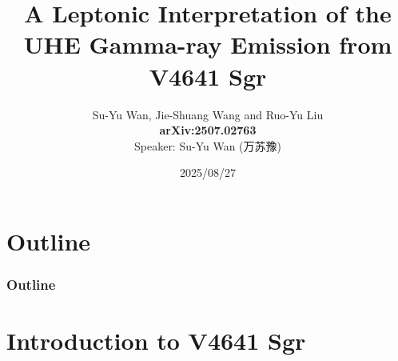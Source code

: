 \documentclass[10pt,aspectratio=169,mathserif]{beamer}
\title{A Leptonic Interpretation of the UHE Gamma-ray Emission from V4641 Sgr}
\author[Su-Yu Wan]{Su-Yu Wan, Jie-Shuang Wang and Ruo-Yu Liu\\
    \textbf{arXiv:2507.02763}\\
    \vspace{1em}
    Speaker: Su-Yu Wan (万苏豫)
  }
\date{2025/08/27}                                                 %
\begin{document}
\begin{frame}                                                %
\titlepage
\end{frame}				
\section{Outline}						 %
\begin{frame}
\frametitle{Outline}
\tableofcontents
\end{frame}				

\section{Introduction to V4641 Sgr}
\end{document}
